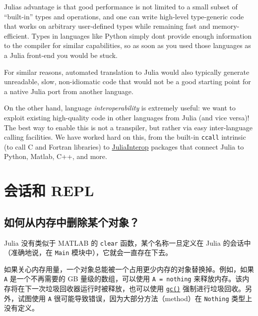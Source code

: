 Julia{\textquotesingle}s advantage is that good performance is not limited to a small subset of “built-in” types and operations, and one can write high-level type-generic code that works on arbitrary user-defined types while remaining fast and memory-efficient.  Types in languages like Python simply don{\textquotesingle}t provide enough information to the compiler for similar capabilities, so as soon as you used those languages as a Julia front-end you would be stuck.



For similar reasons, automated translation to Julia would also typically generate unreadable, slow, non-idiomatic code that would not be a good starting point for a native Julia port from another language.



On the other hand, language \emph{interoperability} is extremely useful: we want to exploit existing high-quality code in other languages from Julia (and vice versa)!  The best way to enable this is not a transpiler, but rather via easy inter-language calling facilities.  We have worked hard on this, from the built-in \texttt{ccall} intrinsic (to call C and Fortran libraries) to \href{https://github.com/JuliaInterop}{JuliaInterop} packages that connect Julia to Python, Matlab, C++, and more.



\hypertarget{4239210502811614787}{}


\section{会话和 REPL}



\hypertarget{503979811911045199}{}


\subsection{如何从内存中删除某个对象？}



Julia 没有类似于 MATLAB 的 \texttt{clear} 函数，某个名称一旦定义在 Julia 的会话中（准确地说，在 \texttt{Main} 模块中），它就会一直存在下去。



如果关心内存用量，一个对象总能被一个占用更少内存的对象替换掉。例如，如果 \texttt{A} 是一个不再需要的 GB 量级的数组，可以使用 \texttt{A = nothing} 来释放内存。该内存将在下一次垃圾回收器运行时被释放，也可以使用 \hyperlink{16287035550645122381}{\texttt{gc()}} 强制进行垃圾回收。另外，试图使用 \texttt{A} 很可能导致错误，因为大部分方法（method）在 \texttt{Nothing} 类型上没有定义。



